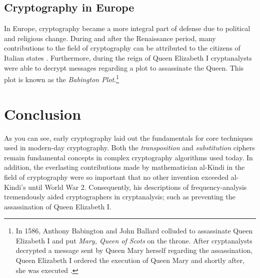 \subsection{Cryptography in Europe}

In Europe, cryptography became a more integral part of defense due to political and religious change. During and after the Renaissance period,
many contributions to the field of cryptography can be attributed to the citizens of Italian states \cite{wiki:history_of_cryptography}.
Furthermore, during the reign of Queen Elizabeth I cryptanalysts were able to decrypt messages regarding a plot to assassinate the Queen.
This plot is known as the \textit{Babington Plot}.\footnote{In 1586, Anthony Babington and John Ballard colluded to assassinate Queen Elizabeth I 
and put \textit{Mary, Queen of Scots} on the throne. After cryptanalysts decrypted a message sent by Queen Mary herself regarding the assassination, Queen
Elizabeth I ordered the execution of Queen Mary and shortly after, she was executed \cite{wiki:babington_plot}. }

\section{Conclusion}

As you can see, early cryptography laid out the fundamentals for core techniques used in modern-day cryptography.
Both the \textit{transposition} and \textit{substitution} ciphers remain fundamental concepts in complex cryptography
algorithms used today. In addition, the everlasting contributions made by mathematician al-Kindi in the field
of cryptography were so important that no other invention exceeded al-Kindi's until World War 2. Consequently, his descriptions of 
frequency-analysis tremendously aided cryptographers in cryptanalysis; such as preventing the assassination of Queen Elizabeth I.

